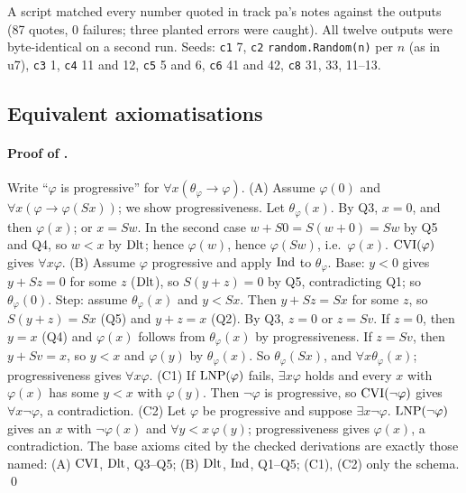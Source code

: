 A script matched every number quoted in track pa's notes against the outputs (87 quotes, 0 failures; three planted errors were caught). All twelve outputs were byte-identical on a second run. Seeds: \texttt{c1} 7, \texttt{c2} \texttt{random.Random(n)} per $n$ (as in u7), \texttt{c3} 1, \texttt{c4} 11 and 12, \texttt{c5} 5 and 6, \texttt{c6} 41 and 42, \texttt{c8} 31, 33, 11--13.

\subsection{Equivalent axiomatisations}\label{app:pa:equiv}

\paragraph{Proof of .} Write ``$\varphi$ is progressive'' for $\forall x(\theta_\varphi\to\varphi)$.
(A) Assume $\varphi(0)$ and $\forall x(\varphi\to\varphi(Sx))$; we show progressiveness. Let $\theta_\varphi(x)$. By Q3, $x=0$, and then $\varphi(x)$; or $x=Sw$. In the second case $w+S0=S(w+0)=Sw$ by Q5 and Q4, so $w<x$ by $\mathrm{Dlt}$; hence $\varphi(w)$, hence $\varphi(Sw)$, i.e.\ $\varphi(x)$. $\mathrm{CVI}(\varphi)$ gives $\forall x\varphi$.
(B) Assume $\varphi$ progressive and apply $\mathrm{Ind}$ to $\theta_\varphi$. Base: $y<0$ gives $y+Sz=0$ for some $z$ ($\mathrm{Dlt}$), so $S(y+z)=0$ by Q5, contradicting Q1; so $\theta_\varphi(0)$. Step: assume $\theta_\varphi(x)$ and $y<Sx$. Then $y+Sz=Sx$ for some $z$, so $S(y+z)=Sx$ (Q5) and $y+z=x$ (Q2). By Q3, $z=0$ or $z=Sv$. If $z=0$, then $y=x$ (Q4) and $\varphi(x)$ follows from $\theta_\varphi(x)$ by progressiveness. If $z=Sv$, then $y+Sv=x$, so $y<x$ and $\varphi(y)$ by $\theta_\varphi(x)$. So $\theta_\varphi(Sx)$, and $\forall x\theta_\varphi(x)$; progressiveness gives $\forall x\varphi$.
(C1) If $\mathrm{LNP}(\varphi)$ fails, $\exists x\varphi$ holds and every $x$ with $\varphi(x)$ has some $y<x$ with $\varphi(y)$. Then $\neg\varphi$ is progressive, so $\mathrm{CVI}(\neg\varphi)$ gives $\forall x\neg\varphi$, a contradiction.
(C2) Let $\varphi$ be progressive and suppose $\exists x\neg\varphi$. $\mathrm{LNP}(\neg\varphi)$ gives an $x$ with $\neg\varphi(x)$ and $\forall y<x\,\varphi(y)$; progressiveness gives $\varphi(x)$, a contradiction.
The base axioms cited by the checked derivations are exactly those named: (A) $\mathrm{CVI}$, $\mathrm{Dlt}$, Q3--Q5; (B) $\mathrm{Dlt}$, $\mathrm{Ind}$, Q1--Q5; (C1), (C2) only the schema. \qed

